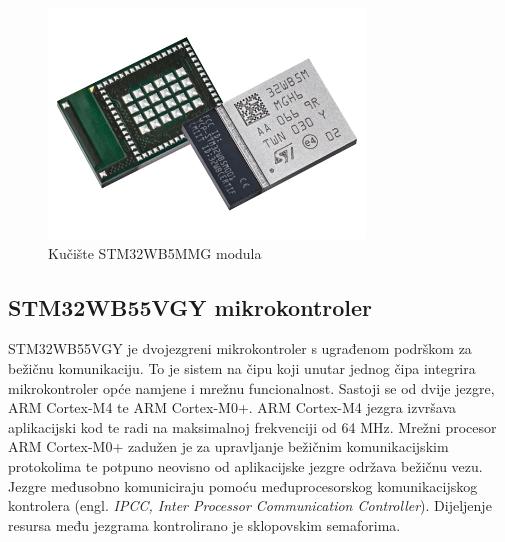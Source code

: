 \documentclass[../diplomski_rad.tex]{subfiles}
\begin{document}
\begin{figure}[htb]
    \centering
    \includegraphics[width=0.75\textwidth]{Figures/modul.png} 
    \caption{Kučište STM32WB5MMG modula \cite{modul_slika}}
    \label{slk:stm32module_kuciste}
\end{figure}

\subsection{STM32WB55VGY mikrokontroler}

STM32WB55VGY je dvojezgreni mikrokontroler s ugrađenom podrškom za bežičnu komunikaciju. 
To je sistem na čipu koji unutar jednog čipa integrira mikrokontroler opće namjene i mrežnu funcionalnost. 
Sastoji se od dvije jezgre, ARM Cortex-M4 te ARM Cortex-M0+.  
ARM Cortex-M4 jezgra izvršava aplikacijski kod te radi na maksimalnoj frekvenciji od 64 MHz. 
Mrežni procesor ARM Cortex-M0+ zadužen je za upravljanje bežičnim komunikacijskim protokolima 
te potpuno neovisno od aplikacijske jezgre održava bežičnu vezu.
Jezgre međusobno komuniciraju pomoću međuprocesorskog komunikacijskog kontrolera (engl. \textit{IPCC,  Inter Processor
Communication Controller}). 
Dijeljenje resursa među jezgrama kontrolirano je sklopovskim semaforima.
\end{document}
